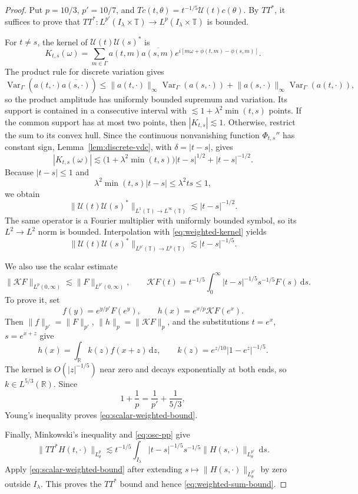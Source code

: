 \documentclass[11pt,a4paper]{amsart}
\numberwithin{equation}{section}
\newcommand{\T}{\mathbb T}
\newcommand{\dd}{\,\mathrm d}
\newcommand{\norm}[1]{\lVert #1\rVert}
\begin{document}
\begin{proof}
Put \(p=10/3\), \(p'=10/7\), and
\(Tc(t,\theta)=t^{-1/5}\mathcal U(t)c(\theta)\). By \(TT^*\), it suffices to
prove that \(TT^*:L^{p'}(I_\lambda\times\T)\to
L^p(I_\lambda\times\T)\) is bounded.

For \(t\ne s\), the kernel of \(\mathcal U(t)\mathcal U(s)^*\) is
\[
 K_{t,s}(\omega)
 =\sum_{m\in\Gamma}a(t,m)\overline{a(s,m)}
 e^{i[m\omega+\phi(t,m)-\phi(s,m)]}.
\]
The product rule for discrete variation gives
\[
 \operatorname{Var}_\Gamma(a(t,\cdot)\overline{a(s,\cdot)})
 \le \norm{a(t,\cdot)}_\infty\operatorname{Var}_\Gamma(a(s,\cdot))
 +\norm{a(s,\cdot)}_\infty\operatorname{Var}_\Gamma(a(t,\cdot)),
\]
so the product amplitude has uniformly bounded supremum and variation. Its
support is contained in a consecutive interval with
\(\lesssim1+\lambda^2\min(t,s)\) points. If the common support has at most two
points, then \(|K_{t,s}|\lesssim1\). Otherwise, restrict the sum to its convex
hull. Since the continuous nonvanishing function \(\Phi_{t,s}''\) has constant
sign, Lemma~\ref{lem:discrete-vdc}, with \(\delta=|t-s|\), gives
\[
 |K_{t,s}(\omega)|
 \lesssim
 \bigl(1+\lambda^2\min(t,s)\bigr)|t-s|^{1/2}
 +|t-s|^{-1/2}.
\]
Because \(|t-s|\le1\) and
\[
 \lambda^2\min(t,s)|t-s|\le\lambda^2ts\le1,
\]
we obtain
\begin{equation}\label{eq:weighted-kernel}
 \norm{\mathcal U(t)\mathcal U(s)^*}_{L^1(\T)\to L^\infty(\T)}
 \lesssim|t-s|^{-1/2}.
\end{equation}
The same operator is a Fourier multiplier with uniformly bounded symbol, so
its \(L^2\to L^2\) norm is bounded. Interpolation with
\eqref{eq:weighted-kernel} yields
\begin{equation}\label{eq:osc-pp}
 \norm{\mathcal U(t)\mathcal U(s)^*}_{L^{p'}(\T)\to L^p(\T)}
 \lesssim|t-s|^{-1/5}.
\end{equation}

We also use the scalar estimate
\begin{equation}\label{eq:scalar-weighted-bound}
 \norm{\mathcal K F}_{L^p(0,\infty)}
 \lesssim\norm F_{L^{p'}(0,\infty)},
 \qquad
 \mathcal K F(t)=t^{-1/5}\int_0^\infty
 |t-s|^{-1/5}s^{-1/5}F(s)\dd s.
\end{equation}
To prove it, set
\[
 f(y)=e^{y/p'}F(e^y),\qquad
 h(x)=e^{x/p}\mathcal K F(e^x).
\]
Then \(\norm f_{p'}=\norm F_{p'}\),
\(\norm h_p=\norm{\mathcal K F}_p\), and the substitutions
\(t=e^x\), \(s=e^{x+z}\) give
\[
 h(x)=\int_\mathbb R k(z)f(x+z)\dd z,
 \qquad k(z)=e^{z/10}|1-e^z|^{-1/5}.
\]
The kernel is \(O(|z|^{-1/5})\) near zero and decays exponentially at both
ends, so \(k\in L^{5/3}(\mathbb R)\). Since
\[
 1+\frac1p=\frac1{p'}+\frac1{5/3},
\]
Young's inequality proves \eqref{eq:scalar-weighted-bound}.

Finally, Minkowski's inequality and \eqref{eq:osc-pp} give
\[
 \norm{TT^*H(t,\cdot)}_{L_\theta^p}
 \lesssim t^{-1/5}\int_{I_\lambda}|t-s|^{-1/5}s^{-1/5}
 \norm{H(s,\cdot)}_{L_\theta^{p'}}\dd s.
\]
Apply \eqref{eq:scalar-weighted-bound} after extending
\(s\mapsto\norm{H(s,\cdot)}_{L_\theta^{p'}}\) by zero outside
\(I_\lambda\). This proves the \(TT^*\) bound and hence
\eqref{eq:weighted-sum-bound}.
\end{proof}
\end{document}
